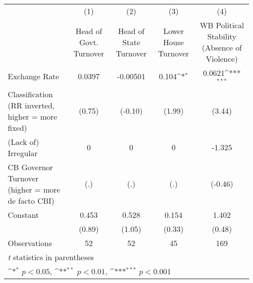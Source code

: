 {
\def\sym#1{\ifmmode^{#1}\else\(^{#1}\)\fi}
\begin{tabular}{l*{4}{c}}
\hline\hline
                    &\multicolumn{1}{c}{(1)}&\multicolumn{1}{c}{(2)}&\multicolumn{1}{c}{(3)}&\multicolumn{1}{c}{(4)}\\
                    &\multicolumn{1}{c}{Head of Govt. Turnover}&\multicolumn{1}{c}{Head of State Turnover}&\multicolumn{1}{c}{Lower House Turnover}&\multicolumn{1}{c}{WB Political Stability (Absence of Violence)}\\
\hline
Exchange Rate       &      0.0397         &    -0.00501         &       0.104\sym{*}  &      0.0621\sym{***}\\
Classification (RR inverted, higher = more fixed)&      (0.75)         &     (-0.10)         &      (1.99)         &      (3.44)         \\
[1em]
(Lack of) Irregular &           0         &           0         &           0         &      -1.325         \\
CB Governor Turnover (higher = more de facto CBI)&         (.)         &         (.)         &         (.)         &     (-0.46)         \\
[1em]
Constant            &       0.453         &       0.528         &       0.154         &       1.402         \\
                    &      (0.89)         &      (1.05)         &      (0.33)         &      (0.48)         \\
\hline
Observations        &          52         &          52         &          45         &         169         \\
\hline\hline
\multicolumn{5}{l}{\footnotesize \textit{t} statistics in parentheses}\\
\multicolumn{5}{l}{\footnotesize \sym{*} \(p<0.05\), \sym{**} \(p<0.01\), \sym{***} \(p<0.001\)}\\
\end{tabular}
}
